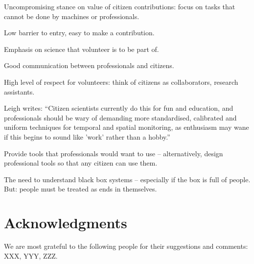 \documentclass{ar2e}
\begin{document}
Uncompromising stance on value of citizen contributions: focus on tasks that
cannot be done by machines or professionals.

Low barrier to entry, easy to make a contribution.

Emphasis on science that volunteer is to be part of. 

Good communication between professionals and citizens.

High level of respect for volunteers: think of citizens as collaborators,
research assistants.

Leigh writes: ``Citizen
scientists currently do this for fun and education, and professionals should
be wary of demanding more standardised, calibrated and uniform techniques for
temporal and spatial monitoring, as enthusiasm may wane if this begins to
sound like 'work' rather than a hobby.''

Provide tools that professionals would want to use -- alternatively, design
professional tools so that any citizen can use them.

The need to understand black box systems -- especially if the box is full of
people. But: people must be treated as ends in themselves. 




\section*{Acknowledgments}

We are most grateful to the following people for their suggestions and comments:
XXX, YYY, ZZZ. 
\end{document}
